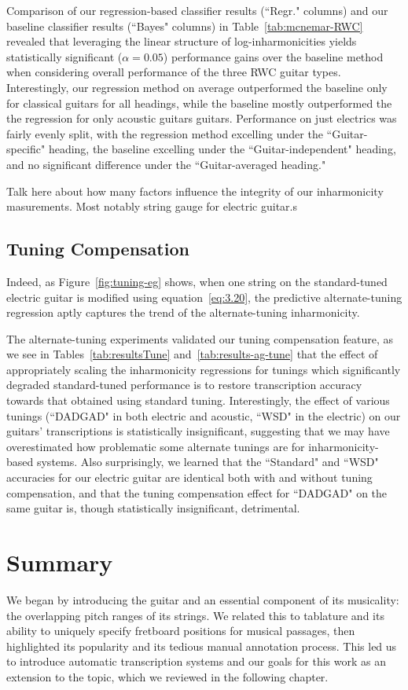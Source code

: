 \documentclass[convention,peer-reviewed]{aesconf}
\begin{document}
Comparison of our regression-based classifier results (``Regr." columns) and our baseline classifier results (``Bayes" columns) in Table~\ref{tab:mcnemar-RWC} revealed that leveraging the linear structure of log-inharmonicities yields statistically significant ($\alpha = 0.05$) performance gains over the baseline method when considering overall performance of the three RWC guitar types. Interestingly, our regression method on average outperformed the baseline only for classical guitars for all headings, while the baseline mostly outperformed the the regression for only acoustic guitars guitars. Performance on just electrics was fairly evenly split, with the regression method excelling under the ``Guitar-specific" heading, the baseline excelling under the ``Guitar-independent" heading, and no significant difference under the ``Guitar-averaged heading."

Talk here about how many factors influence the integrity of our inharmonicity masurements. Most notably string gauge for electric guitar.s

\subsection{Tuning Compensation}
Indeed, as Figure~\ref{fig:tuning-eg} shows, when one string on the standard-tuned electric guitar is modified using equation~\eqref{eq:3.20}, the predictive alternate-tuning regression aptly captures the trend of the alternate-tuning inharmonicity.

The alternate-tuning experiments validated our tuning compensation feature, as we see in Tables~\ref{tab:resultsTune} and~\ref{tab:results-ag-tune} that the effect of appropriately scaling the inharmonicity regressions for tunings which significantly degraded standard-tuned performance is to restore transcription accuracy towards that obtained using standard tuning. Interestingly, the effect of various tunings (``DADGAD" in both electric and acoustic, ``WSD" in the electric) on our guitars' transcriptions is statistically insignificant, suggesting that we may have overestimated how problematic some alternate tunings are for inharmonicity-based systems. Also surprisingly, we learned that the ``Standard" and ``WSD" accuracies for our electric guitar are identical both with and without tuning compensation, and that the tuning compensation effect for ``DADGAD" on the same guitar is, though statistically insignificant, detrimental.

\section{Summary} 
We began by introducing the guitar and an essential component of its musicality: the overlapping pitch ranges of its strings. We related this to tablature and its ability to uniquely specify fretboard positions for musical passages, then highlighted its popularity and its tedious manual annotation process. This led us to introduce automatic transcription systems and our goals for this work as an extension to the topic, which we reviewed in the following chapter.
\end{document}
